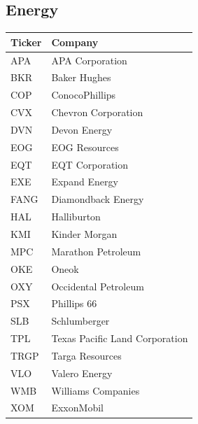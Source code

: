 \documentclass[11pt,a4paper]{article}
\begin{document}
\subsection{Energy}
\begin{table}[H]
\centering
\small
\begin{tabular}{lp{11cm}}
\hline
Ticker & Company \\
\hline
APA & APA Corporation \\
BKR & Baker Hughes \\
COP & ConocoPhillips \\
CVX & Chevron Corporation \\
DVN & Devon Energy \\
EOG & EOG Resources \\
EQT & EQT Corporation \\
EXE & Expand Energy \\
FANG & Diamondback Energy \\
HAL & Halliburton \\
KMI & Kinder Morgan \\
MPC & Marathon Petroleum \\
OKE & Oneok \\
OXY & Occidental Petroleum \\
PSX & Phillips 66 \\
SLB & Schlumberger \\
TPL & Texas Pacific Land Corporation \\
TRGP & Targa Resources \\
VLO & Valero Energy \\
WMB & Williams Companies \\
XOM & ExxonMobil \\
\hline
\end{tabular}
\end{table}
\end{document}
